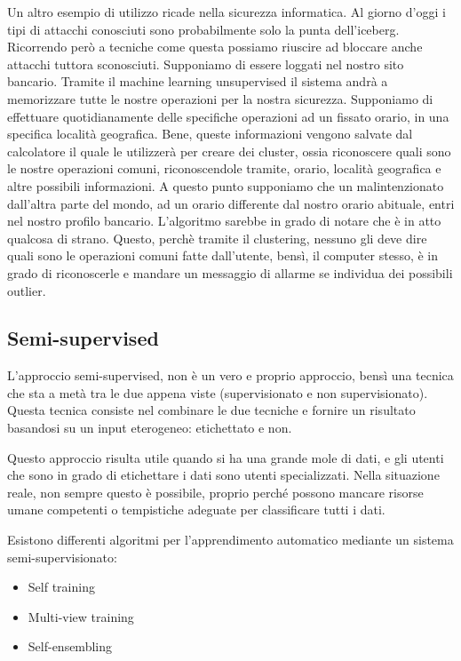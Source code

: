 \documentclass[12pt,italian]{report}
\begin{document}
Un altro esempio di utilizzo ricade nella sicurezza informatica. Al giorno d'oggi i tipi di attacchi conosciuti sono probabilmente solo la punta dell'iceberg. Ricorrendo però a tecniche come questa possiamo riuscire ad bloccare anche attacchi tuttora sconosciuti. 
Supponiamo di essere loggati nel nostro sito bancario. Tramite il machine learning unsupervised il sistema andrà a memorizzare tutte le nostre operazioni per la nostra sicurezza. Supponiamo di effettuare quotidianamente delle specifiche operazioni ad un fissato orario, in una specifica località geografica. Bene, queste informazioni vengono salvate dal calcolatore il quale le utilizzerà per creare dei cluster, ossia riconoscere quali sono le nostre operazioni comuni, riconoscendole tramite, orario, località geografica e altre possibili informazioni. A questo punto supponiamo che un malintenzionato dall'altra parte del mondo, ad un orario differente dal nostro orario abituale, entri nel nostro profilo bancario.   L'algoritmo sarebbe in grado di notare che è in atto qualcosa di strano. Questo, perchè tramite il clustering, nessuno gli deve dire quali sono le operazioni comuni fatte dall'utente, bensì, il computer stesso, è in grado di riconoscerle e mandare un messaggio di allarme se individua dei possibili outlier. 


\pagebreak
\subsection{Semi-supervised}

L'approccio semi-supervised, non è un vero e proprio approccio, bensì una tecnica che sta a metà tra le due appena viste (supervisionato e non supervisionato). Questa tecnica consiste nel combinare le due tecniche e fornire un risultato basandosi su un input eterogeneo: etichettato e non.

Questo approccio risulta utile quando si ha una grande mole di dati, e gli utenti che sono in grado di etichettare i dati sono utenti specializzati. Nella situazione reale, non sempre questo è possibile, proprio perché possono mancare risorse umane competenti o tempistiche adeguate per classificare tutti i dati.

Esistono differenti algoritmi per l'apprendimento automatico mediante un sistema semi-supervisionato:
\begin{itemize}
	\item Self training
	\item Multi-view training
	\item Self-ensembling
\end{itemize}
\end{document}
